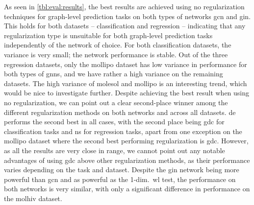 As seen in \cref{tbl:eval:results}, the best results are achieved using no regularization techniques for graph-level prediction tasks on both types of networks \ac{gcn} and \ac{gin}.
This holds for both datasets -- classification and regression -- indicating that any regularization type is unsuitable for both graph-level prediction tasks independently of the network of choice.
For both classification datasets, the variance is very small; the network performance is stable. Out of the three regression datasets, only the mollipo dataset has low variance in performance for both types of \acp{gnn}, and we have rather a high variance on the remaining datasets.
The high variance of molesol and mollipo is an interesting trend, which would be nice to investigate further.
Despite achieving the best result when using no regularization, we can point out a clear second-place winner among the different regularization methods on both networks and across all datasets.
\Ac{de} performs the second best in all cases, with the second place being \ac{gdc} for classification tasks and \ac{ns} for regression tasks, apart from one exception on the mollipo dataset where the second best performing regularization is \ac{gdc}.
However, as all the results are very close in range, we cannot point out any notable advantages of using \ac{gdc} above other regularization methods, as their performance varies depending on the task and dataset.
Despite the \ac{gin} network being more powerful than \ac{gcn} and as powerful as the 1-dim.\ \ac{wl} test, the performance on both networks is very similar, with only a significant difference in performance on the molhiv dataset.

